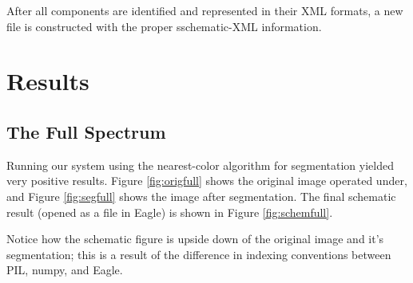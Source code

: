 \documentclass[10pt,twocolumn,letterpaper]{article}
\begin{document}
After all components are identified and represented in their XML formats, a new
file is constructed with the proper sschematic-XML information.    

\section{Results}

\subsection{The Full Spectrum}

Running our system using the nearest-color algorithm for segmentation yielded
very positive results. Figure \ref{fig:origfull} shows the original image
operated under, and Figure \ref{fig:segfull} shows the image after
segmentation. The final schematic result (opened as a file in Eagle) is shown
in Figure \ref{fig:schemfull}. 

Notice how the schematic figure is upside down of the original image and it's
segmentation; this is a result of the difference in indexing conventions
between PIL, numpy, and Eagle.
\end{document}
